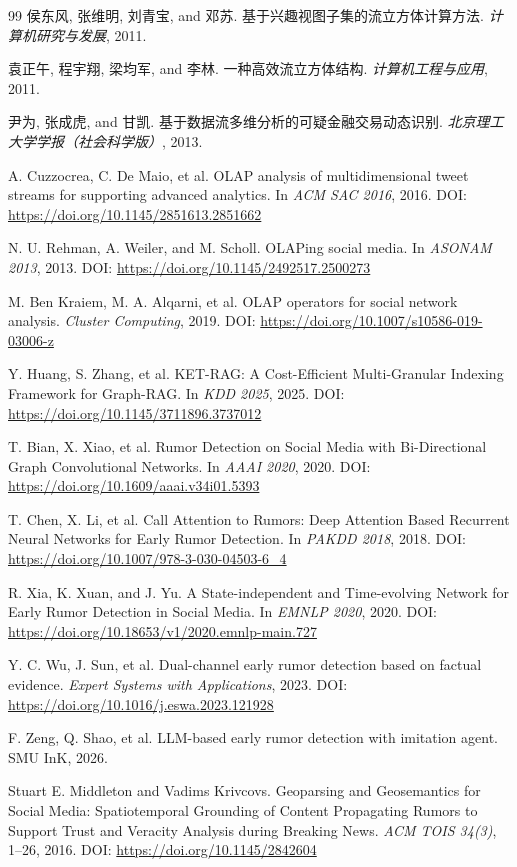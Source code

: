 \begin{thebibliography}{99}
 侯东风, 张维明, 刘青宝, and 邓苏. 基于兴趣视图子集的流立方体计算方法. \emph{计算机研究与发展}, 2011.

 袁正午, 程宇翔, 梁均军, and 李林. 一种高效流立方体结构. \emph{计算机工程与应用}, 2011.

 尹为, 张成虎, and 甘凯. 基于数据流多维分析的可疑金融交易动态识别. \emph{北京理工大学学报（社会科学版）}, 2013.

 A. Cuzzocrea, C. De Maio, et al. OLAP analysis of multidimensional tweet streams for supporting advanced analytics. In \emph{ACM SAC 2016}, 2016. DOI: \url{https://doi.org/10.1145/2851613.2851662}

 N. U. Rehman, A. Weiler, and M. Scholl. OLAPing social media. In \emph{ASONAM 2013}, 2013. DOI: \url{https://doi.org/10.1145/2492517.2500273}

 M. Ben Kraiem, M. A. Alqarni, et al. OLAP operators for social network analysis. \emph{Cluster Computing}, 2019. DOI: \url{https://doi.org/10.1007/s10586-019-03006-z}

 Y. Huang, S. Zhang, et al. KET-RAG: A Cost-Efficient Multi-Granular Indexing Framework for Graph-RAG. In \emph{KDD 2025}, 2025. DOI: \url{https://doi.org/10.1145/3711896.3737012}

 T. Bian, X. Xiao, et al. Rumor Detection on Social Media with Bi-Directional Graph Convolutional Networks. In \emph{AAAI 2020}, 2020. DOI: \url{https://doi.org/10.1609/aaai.v34i01.5393}

 T. Chen, X. Li, et al. Call Attention to Rumors: Deep Attention Based Recurrent Neural Networks for Early Rumor Detection. In \emph{PAKDD 2018}, 2018. DOI: \url{https://doi.org/10.1007/978-3-030-04503-6_4}

 R. Xia, K. Xuan, and J. Yu. A State-independent and Time-evolving Network for Early Rumor Detection in Social Media. In \emph{EMNLP 2020}, 2020. DOI: \url{https://doi.org/10.18653/v1/2020.emnlp-main.727}

 Y. C. Wu, J. Sun, et al. Dual-channel early rumor detection based on factual evidence. \emph{Expert Systems with Applications}, 2023. DOI: \url{https://doi.org/10.1016/j.eswa.2023.121928}

 F. Zeng, Q. Shao, et al. LLM-based early rumor detection with imitation agent. SMU InK, 2026.

 Stuart E. Middleton and Vadims Krivcovs. Geoparsing and Geosemantics for Social Media: Spatiotemporal Grounding of Content Propagating Rumors to Support Trust and Veracity Analysis during Breaking News. \emph{ACM TOIS 34(3)}, 1–26, 2016. DOI: \url{https://doi.org/10.1145/2842604}


\end{thebibliography}
